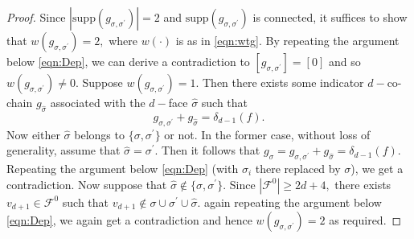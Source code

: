 \documentclass[12pt]{amsart}
\numberwithin{equation}{section}
\numberwithin{theorem}{section}
\newcommand{\cobdr}{\delta}
\newcommand{\1}{\mathbf{1}}
\def\F{\mathcal{F}}
\def\supp{\mathrm{supp}}
\begin{document}
\begin{proof}
Since $|\supp(g_{\sigma, \sigma^\prime})| = 2$ and $\supp(g_{\sigma, \sigma^\prime})$ is connected, it suffices to show that $w(g_{\sigma, \sigma^\prime}) = 2,$ where $w(\cdot)$ is as in \eqref{eqn:wtg}. By repeating the argument below \eqref{eqn:Dep}, we can derive a contradiction to $[g_{\sigma,\sigma^{\prime}}] = [0]$ and so $w(g_{\sigma, \sigma^\prime}) \neq 0.$ Suppose $w(g_{\sigma, \sigma^\prime}) = 1.$ Then there exists some indicator $d-$co-chain $g_{\hat{\sigma}}$ associated with the $d-$face $\hat{\sigma}$ such that
%
\[
g_{\sigma, \sigma^\prime} +  g_{\hat{\sigma}} = \cobdr_{d - 1}(f).
\]
%
Now either $\hat{\sigma}$ belongs to $\{\sigma, \sigma^\prime\}$ or not. In the former case, without loss of generality, assume that $\hat{\sigma} = \sigma^\prime.$ Then it follows that $g_{\sigma} = g_{\sigma, \sigma^\prime} + g_{\hat{\sigma}} = \delta_{d - 1}(f).$ Repeating the argument below \eqref{eqn:Dep} (with $\sigma_i$ there replaced by $\sigma$), we get a contradiction. Now suppose that $\hat{\sigma} \notin \{\sigma, \sigma^\prime\}.$ Since $|\F^0| \geq 2d + 4,$ there exists $v_{d + 1} \in \F^0$ such that $v_{d + 1} \notin \sigma \cup \sigma^\prime \cup \hat{\sigma}.$ again repeating the argument below \eqref{eqn:Dep}, we again get a contradiction and hence
$w(g_{\sigma, \sigma^\prime}) = 2$ as required.
\end{proof}


\end{document}
